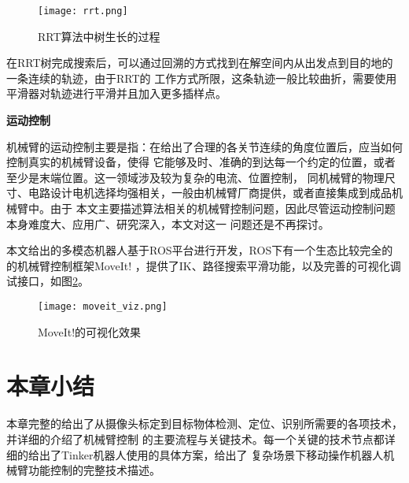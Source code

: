 \begin{figure}[h] %
  \centering
  \texttt{[image: rrt.png]}
  \caption{RRT算法中树生长的过程\cite{kuffner2000rrt}}
  \label{fig:rrt}
\end{figure}

在RRT树完成搜索后，可以通过回溯的方式找到在解空间内从出发点到目的地的一条连续的轨迹，由于RRT的
工作方式所限，这条轨迹一般比较曲折，需要使用平滑器对轨迹进行平滑并且加入更多插样点。

\noindent \textbf{运动控制}

机械臂的运动控制主要是指：在给出了合理的各关节连续的角度位置后，应当如何控制真实的机械臂设备，使得
它能够及时、准确的到达每一个约定的位置，或者至少是末端位置。这一领域涉及较为复杂的电流、位置控制，
同机械臂的物理尺寸、电路设计电机选择均强相关，一般由机械臂厂商提供，或者直接集成到成品机械臂中。由于
本文主要描述算法相关的机械臂控制问题，因此尽管运动控制问题本身难度大、应用广、研究深入，本文对这一
问题还是不再探讨。


本文给出的多模态机器人基于ROS平台进行开发，ROS下有一个生态比较完全的的机械臂控制框架MoveIt!\citep{chitta2012moveit}
，提供了IK、路径搜索平滑功能，以及完善的可视化调试接口，如图\ref{fig:moveit_viz}。

\begin{figure}[h] %
  \centering
  \texttt{[image: moveit\_viz.png]}
  \caption{MoveIt!的可视化效果}
  \label{fig:moveit_viz}
\end{figure}


\section{本章小结}

本章完整的给出了从摄像头标定到目标物体检测、定位、识别所需要的各项技术，并详细的介绍了机械臂控制
的主要流程与关键技术。每一个关键的技术节点都详细的给出了Tinker机器人使用的具体方案，给出了
复杂场景下移动操作机器人机械臂功能控制的完整技术描述。






















